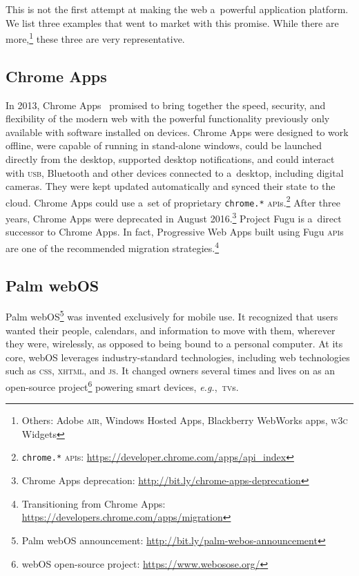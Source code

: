 \documentclass[sigconf]{acmart}
\begin{document}
This is not the first attempt at making the web a~powerful application platform.
We list three examples that went to market with this promise.
While there are more,\footnote{Others: Adobe \textsc{air}, Windows Hosted Apps,
Blackberry WebWorks apps, \textsc{w3c} Widgets} these three are very representative.

\subsection{Chrome Apps}

In 2013, Chrome Apps~\cite{kay13} promised to bring together the speed, security,
and flexibility of the modern web with the powerful functionality
previously only available with software installed on devices. 
Chrome Apps were designed to work offline, were capable of running in stand-alone windows,
could be launched directly from the desktop,
supported desktop notifications,
and could interact with \textsc{usb}, Bluetooth and other devices connected to a~desktop,
including digital cameras.
They were kept updated automatically and synced their state to the cloud.
Chrome Apps could use a~set of proprietary \texttt{chrome.*}
\textsc{api}s.\footnote{\texttt{chrome.*}
\textsc{api}s: \url{https://developer.chrome.com/apps/api_index}}
After three years, Chrome Apps were deprecated in August
2016.\footnote{Chrome Apps deprecation:
\url{http://bit.ly/chrome-apps-deprecation}}
Project Fugu is a~direct successor to Chrome Apps.
In fact, Progressive Web Apps built using Fugu \textsc{api}s
are one of the recommended migration
strategies.\footnote{Transitioning from Chrome Apps: \url{https://developers.chrome.com/apps/migration}}

\subsection{Palm web\textsc{OS}}

Palm web\textsc{OS}\footnote{Palm web\textsc{OS} announcement:
\url{http://bit.ly/palm-webos-announcement}}
was invented exclusively for mobile use.
It recognized that users wanted their people, calendars, and information to move with them,
wherever they were, wirelessly, as opposed to being bound to a personal computer.
At its core, web\textsc{OS} leverages industry-standard technologies,
including web technologies such as \textsc{css}, \textsc{xhtml}, and \textsc{js}.
It changed owners several times and lives on as an open-source
project\footnote{web\textsc{OS} open-source project: \url{https://www.webosose.org/}}
powering smart devices, \textit{e.g.},\ \textsc{tv}s.
\end{document}
